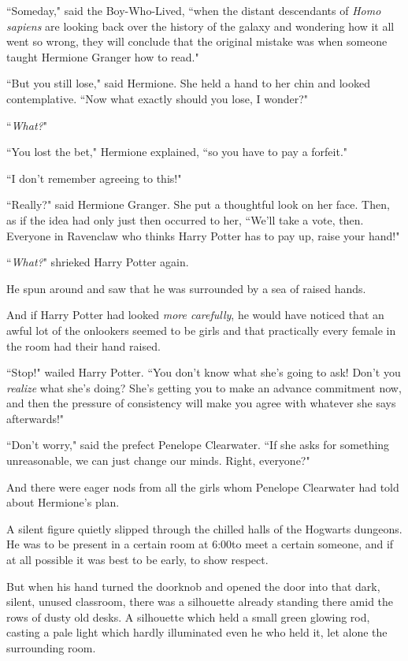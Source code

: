 ``Someday," said the Boy-Who-Lived, ``when the distant descendants of \emph{Homo sapiens} are looking back over the history of the galaxy and wondering how it all went so wrong, they will conclude that the original mistake was when someone taught Hermione Granger how to read."

``But you still lose," said Hermione. She held a hand to her chin and looked contemplative. ``Now what exactly should you lose, I wonder?"

``\emph{What?}"

``You lost the bet," Hermione explained, ``so you have to pay a forfeit."

``I don't remember agreeing to this!"

``Really?" said Hermione Granger. She put a thoughtful look on her face. Then, as if the idea had only just then occurred to her, ``We'll take a vote, then. Everyone in Ravenclaw who thinks Harry Potter has to pay up, raise your hand!"

``\emph{What?}" shrieked Harry Potter again.

He spun around and saw that he was surrounded by a sea of raised hands.

And if Harry Potter had looked \emph{more carefully}, he would have noticed that an awful lot of the onlookers seemed to be girls and that practically every female in the room had their hand raised.

``Stop!" wailed Harry Potter. ``You don't know what she's going to ask! Don't you \emph{realize} what she's doing? She's getting you to make an advance commitment now, and then the pressure of consistency will make you agree with whatever she says afterwards!"

``Don't worry," said the prefect Penelope Clearwater. ``If she asks for something unreasonable, we can just change our minds. Right, everyone?"

And there were eager nods from all the girls whom Penelope Clearwater had told about Hermione's plan.

\later

A silent figure quietly slipped through the chilled halls of the Hogwarts dungeons. He was to be present in a certain room at 6:00\pm to meet a certain someone, and if at all possible it was best to be early, to show respect.

But when his hand turned the doorknob and opened the door into that dark, silent, unused classroom, there was a silhouette already standing there amid the rows of dusty old desks. A silhouette which held a small green glowing rod, casting a pale light which hardly illuminated even he who held it, let alone the surrounding room.


